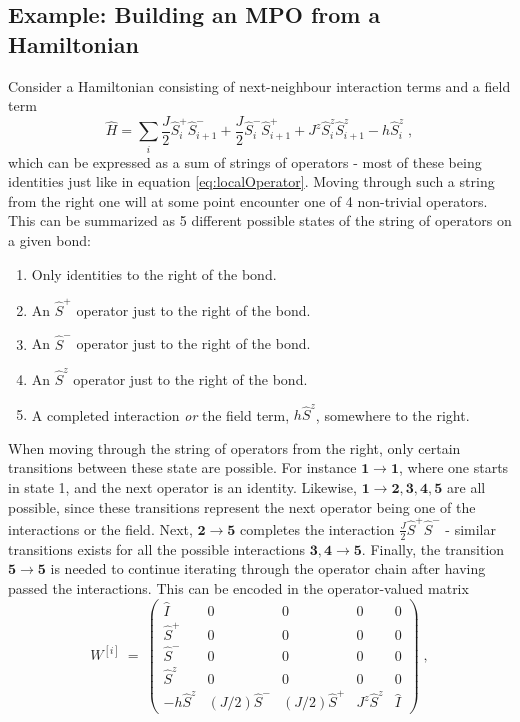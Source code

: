 \subsection{Example: Building an MPO from a Hamiltonian}
Consider a Hamiltonian consisting of next-neighbour interaction terms and a field term
\begin{equation}
	\hat{H} = \sum_i \frac{J}{2} \hat{S}_{i}^{+} \hat{S}_{i+1}^{-} + \frac{J}{2} \hat{S}_{i}^{-} \hat{S}_{i+1}^{+} + J^z \hat{S}_{i}^{z} \hat{S}_{i+1}^{z} - h \hat{S}_{i}^{z} \; ,
	\label{eq:exHamiltonian}
\end{equation}
which can be expressed as a sum of strings of operators - most of these being identities just like in equation \ref{eq:localOperator}. Moving through such a string from the right one will at some point encounter one of 4 non-trivial operators. This can be summarized as 5 different possible states of the string of operators on a given bond:
\begin{enumerate}
	\item
	Only identities to the right of the bond.
	\item
	An $\hat{S}^{+}$ operator just to the right of the bond.
	\item
	An $\hat{S}^{-}$ operator just to the right of the bond.
	\item
	An $\hat{S}^{z}$ operator just to the right of the bond.
	\item
	A completed interaction \textit{or} the field term, $h \hat{S}^{z}$, somewhere to the right.
\end{enumerate}
When moving through the string of operators from the right, only certain transitions between these state are possible. For instance $\boldsymbol{1 \rightarrow 1}$, where one starts in state 1, and the next operator is an identity. Likewise, $\boldsymbol{1 \rightarrow 2,3,4,5}$ are all possible, since these transitions represent the next operator being one of the interactions or the field. Next, $\boldsymbol{2 \rightarrow 5}$ completes the interaction $\frac{J}{2} \hat{S}^{+} \hat{S}^{-}$ - similar transitions exists for all the possible interactions $\boldsymbol{3,4 \rightarrow 5}$. Finally, the transition $\boldsymbol{5 \rightarrow 5}$ is needed to continue iterating through the operator chain after having passed the interactions. This can be encoded in the operator-valued matrix
\begin{equation}
 W^{[i]} \: = \: \begin{pmatrix}
\hat{I} & 0 & 0 & 0 & 0 \\
\hat{S}^+ & 0 & 0 & 0 & 0 \\
\hat{S}^- & 0 & 0 & 0 & 0 \\
\hat{S}^z & 0 & 0 & 0 & 0 \\
-h \hat{S}^z & (J/2) \hat{S}^- & (J/2) \hat{S}^+ & J^z \hat{S}^z & \hat{I}

\end{pmatrix} \; ,
\label{eq:MPOmatrix}
\end{equation}
